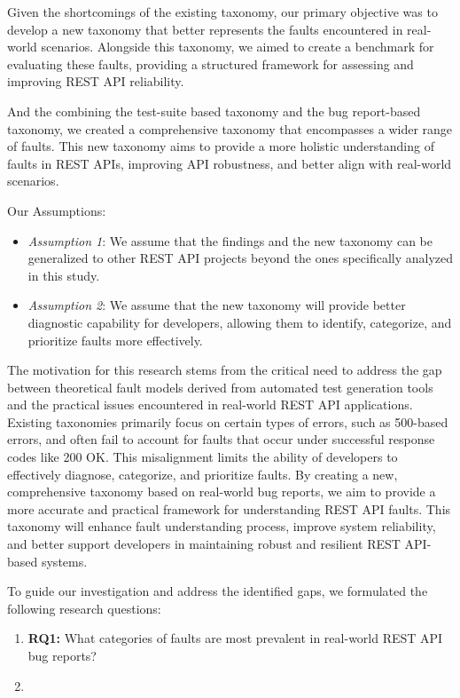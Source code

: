 \documentclass[conference]{IEEEtran}
\begin{document}
Given the shortcomings of the existing taxonomy, our primary objective was to develop a new taxonomy that better represents the faults encountered in real-world scenarios. 
Alongside this taxonomy, we aimed to create a benchmark for evaluating these faults, providing a structured framework for assessing and improving REST API reliability.

And the combining the test-suite based taxonomy and the bug report-based taxonomy, we created a comprehensive taxonomy that encompasses a wider range of faults. 
This new taxonomy aims to provide a more holistic understanding of faults in REST APIs, improving API robustness, and better align with real-world scenarios.


Our Assumptions:

\begin{itemize}
    \item 	\textit{Assumption 1}: We assume that the findings and the new taxonomy can be generalized to other REST API projects beyond the ones specifically analyzed in this study.
    \item   \textit{Assumption 2}: 	We assume that the new taxonomy will provide better diagnostic capability for developers, allowing them to identify, categorize, and prioritize faults more effectively.
\end{itemize}



The motivation for this research stems from the critical need to address the gap between theoretical fault models derived from automated test generation tools and the practical issues encountered in real-world REST API applications. 
Existing taxonomies primarily focus on certain types of errors, such as 500-based errors, and often fail to account for faults that occur under successful response codes like 200 OK. 
This misalignment limits the ability of developers to effectively diagnose, categorize, and prioritize faults. By creating a new, comprehensive taxonomy based on real-world bug reports, we aim to provide a more accurate and practical framework for understanding REST API faults. 
This taxonomy will enhance  fault understanding process, improve system reliability, and better support developers in maintaining robust and resilient REST API-based systems.

To guide our investigation and address the identified gaps, we formulated the following research questions:
\begin{enumerate}
    \item \textbf{RQ1:} What categories of faults are most prevalent in real-world REST API bug reports?
    \item 
\end{enumerate}
\end{document}
